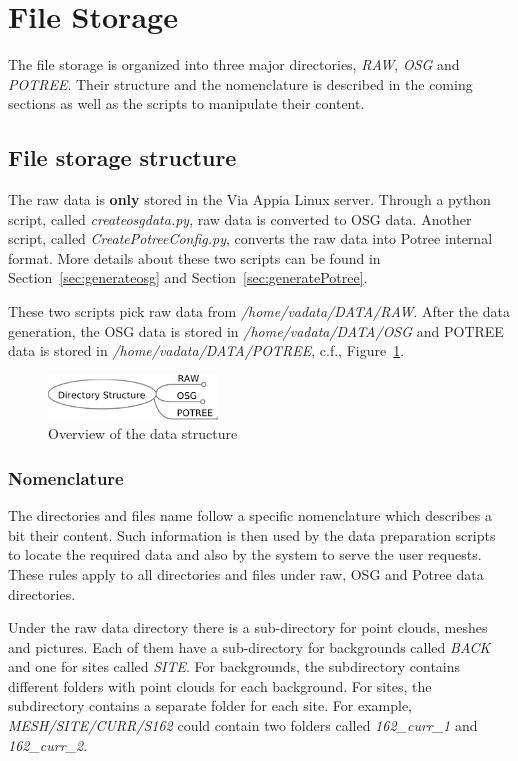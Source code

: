 \section{File Storage}
\label{sec:data_structure}
The file storage is organized into three major directories, {\em RAW}, {\em OSG}
and {\em POTREE}. Their structure and the nomenclature is described in the coming
sections as well as the scripts to manipulate their content.

\subsection{File storage structure}
\label{sec:descriptiondata}
The raw data is \textbf{only} stored in the Via Appia Linux server. Through a python
script, called \textit{createosgdata.py}, raw data is converted to OSG data. Another
script, called \textit{CreatePotreeConfig.py}, converts the raw data into Potree
internal format. More details about these two scripts can be found in Section~\ref{sec:generateosg}
and Section~\ref{sec:generatePotree}. 

These two scripts pick raw data from \textit{/home/vadata/DATA/RAW}. After the data
generation, the OSG data is stored in \textit{/home/vadata/DATA/OSG} and POTREE data
is stored in \textit{/home/vadata/DATA/POTREE}, c.f., Figure~\ref{fig:directory_structure_overview}.

\begin{figure}[!ht] \centering
\includegraphics[width=0.4\textwidth]{fig/data_structure/directory_structure_overview}
\caption{Overview of the data structure}
\label{fig:directory_structure_overview} \end{figure}

\subsubsection{Nomenclature}
The directories and files name follow a specific nomenclature which describes a
bit their content. Such information is then used by the data preparation scripts
to locate the required data and also by the system to serve the user requests.
These rules apply to all directories and files under raw, OSG and Potree data
directories.

Under the raw data directory there is a sub-directory for point clouds, meshes
and pictures. Each of them have a sub-directory for backgrounds called \textit{BACK}
and one for sites called \textit{SITE}. For backgrounds, the subdirectory contains
different folders with point clouds for each background. For sites, the subdirectory
contains a separate folder for each site. For example, \textit{MESH/SITE/CURR/S162}
could contain two folders called \textit{162\_curr\_1} and \textit{162\_curr\_2}.

